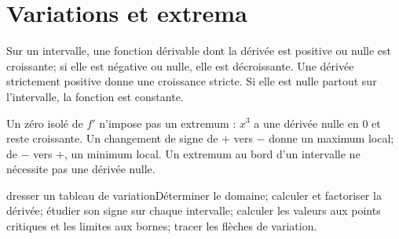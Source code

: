 \section{Variations et extrema}
\begin{theoreme}[admis]Sur un intervalle, une fonction dérivable dont la dérivée est positive ou nulle est croissante; si elle est négative ou nulle, elle est décroissante. Une dérivée strictement positive donne une croissance stricte. Si elle est nulle partout sur l’intervalle, la fonction est constante.\end{theoreme}
\begin{remarque}Un zéro isolé de $f'$ n’impose pas un extremum : $x^3$ a une dérivée nulle en $0$ et reste croissante. Un changement de signe de $+$ vers $-$ donne un maximum local; de $-$ vers $+$, un minimum local. Un extremum au bord d’un intervalle ne nécessite pas une dérivée nulle.\end{remarque}
\begin{methode}{dresser un tableau de variation}Déterminer le domaine; calculer et factoriser la dérivée; étudier son signe sur chaque intervalle; calculer les valeurs aux points critiques et les limites aux bornes; tracer les flèches de variation.\end{methode}


